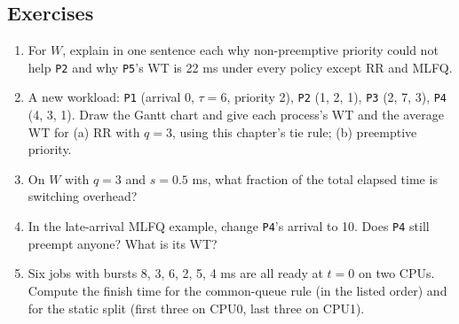 \documentclass[11pt]{article}
\begin{document}
\subsection*{Exercises}
\begin{enumerate}
  \item For $W$, explain in one sentence each why non-preemptive priority could not help \texttt{P2} and why \texttt{P5}'s WT is 22 ms under every policy except RR and MLFQ.
  \item A new workload: \texttt{P1} (arrival 0, $\tau=6$, priority 2), \texttt{P2} (1, 2, 1), \texttt{P3} (2, 7, 3), \texttt{P4} (4, 3, 1). Draw the Gantt chart and give each process's WT and the average WT for (a) RR with $q=3$, using this chapter's tie rule; (b) preemptive priority.
  \item On $W$ with $q=3$ and $s=0.5$ ms, what fraction of the total elapsed time is switching overhead?
  \item In the late-arrival MLFQ example, change \texttt{P4}'s arrival to 10. Does \texttt{P4} still preempt anyone? What is its WT?
  \item Six jobs with bursts 8, 3, 6, 2, 5, 4 ms are all ready at $t=0$ on two CPUs. Compute the finish time for the common-queue rule (in the listed order) and for the static split (first three on CPU0, last three on CPU1).
\end{enumerate}
\end{document}
